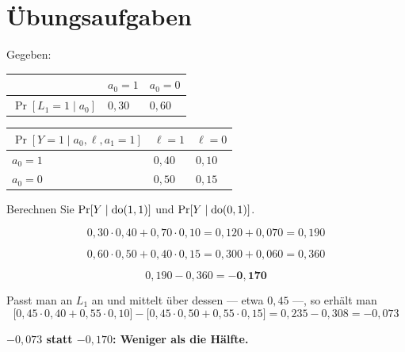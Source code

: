 \section{Übungsaufgaben}

\begin{aufgabe}
Gegeben:
\begin{center}
{\small
\renewcommand{\arraystretch}{1.48}
\begin{tabular}{@{}P{2.4cm}P{2.2cm}P{2.2cm}@{}}
\toprule
& $a_0 = 1$ & $a_0 = 0$\\
\midrule
$\Pr[L_1=1 \mid a_0]$ & $0{,}30$ & $0{,}60$\\
\bottomrule
\end{tabular}}
\end{center}
\begin{center}
{\small
\renewcommand{\arraystretch}{1.48}
\begin{tabular}{@{}P{3.4cm}P{2.0cm}P{2.0cm}@{}}
\toprule
$\Pr[Y=1 \mid a_0,\ell,a_1{=}1]$ & $\ell = 1$ & $\ell = 0$\\
\midrule
$a_0 = 1$ & $0{,}40$ & $0{,}10$\\
$a_0 = 0$ & $0{,}50$ & $0{,}15$\\
\bottomrule
\end{tabular}}
\end{center}
Berechnen Sie $\Pr[Y \mid \operatorname{do}(1,1)]$ und $\Pr[Y \mid \operatorname{do}(0,1)]$.

\loesung
{}
\[ 0{,}30\cdot0{,}40 + 0{,}70\cdot0{,}10 = 0{,}120 + 0{,}070 = 0{,}190 \]

\[ 0{,}60\cdot0{,}50 + 0{,}40\cdot0{,}15 = 0{,}300 + 0{,}060 = 0{,}360 \]

\[ 0{,}190 - 0{,}360 = \mathbf{-0{,}170} \]

Passt man an $L_1$ an und mittelt über dessen  --- etwa $0{,}45$ ---, so erhält man
\[ \bigl[0{,}45\cdot0{,}40 + 0{,}55\cdot0{,}10\bigr] - \bigl[0{,}45\cdot0{,}50 + 0{,}55\cdot0{,}15\bigr] = 0{,}235 - 0{,}308 = -0{,}073 \]

\begin{center}
\begin{minipage}{0.9\textwidth}
\textbf{$-0{,}073$ statt $-0{,}170$: Weniger als die Hälfte.}
\end{minipage}
\end{center}

\begin{center}
\begin{minipage}{0.88\textwidth}
\end{minipage}
\end{center}
\end{aufgabe}

